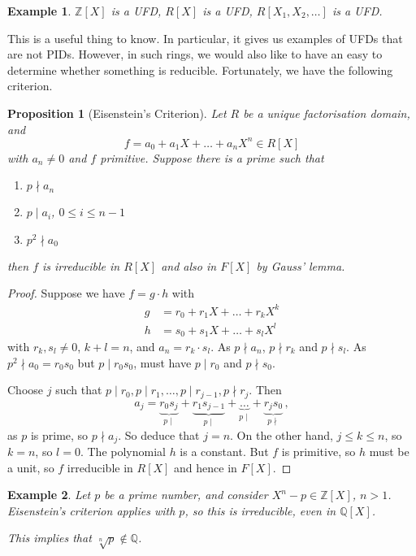 \documentclass{article}
\theoremstyle{plain}\theoremheaderfont{\normalfont\itshape}\theorembodyfont{\rmfamily}\theoremseparator{.}\newtheorem*{rem}{Remark}\newtheorem*{ex}{Example}\newtheorem*{proof}{Proof}\newtheorem*{altp}{Alternative proof}\newtheorem*{nonex}{Non-Example}
\theoremstyle{plain}\theoremheaderfont{\normalfont\bfseries}\theorembodyfont{\rmfamily}\theoremseparator{.}\newtheorem{thm}{Theorem}[section]\newtheorem{lem}[thm]{Lemma}\newtheorem{prop}[thm]{Proposition}\newtheorem*{cor}{Corollary}\newtheorem{defn}[thm]{Definition}\newtheorem{clm}[thm]{Claim}\newtheorem{clminproof}{Claim}\newtheorem*{notn}{Notation}\newtheorem*{exer}{Exercise}\newtheorem*{lemnn}{Lemma}
\theoremstyle{break}\theoremheaderfont{\normalfont\itshape}\theorembodyfont{\rmfamily}\theoremseparator{.\medskip}\newtheorem*{proofskip}{Proof}\newtheorem*{exs}{Examples}\newtheorem*{rems}{Remarks}\newtheorem*{obs}{Observations}
\theoremstyle{break}\theoremheaderfont{\normalfont\bfseries}\theorembodyfont{\rmfamily}\theoremseparator{.\medskip}\newtheorem{lemskip}[thm]{Lemma}\newtheorem{defnskip}[thm]{Definition}\newtheorem{propskip}[thm]{Proposition}\newtheorem{thmskip}[thm]{Theorem}
\numberwithin{equation}{section}
\newcommand{\ZZ}{\mathbb{Z}}
\newcommand{\QQ}{\mathbb{Q}}
\begin{document}
    \begin{ex}
        \(\ZZ[X]\) is a UFD, \(R[X]\) is a UFD, \(R[X_1,X_2,\dots]\) is a UFD.
    \end{ex}
    This is a useful thing to know. In particular, it gives us examples of UFDs that are not PIDs. However, in such rings, we would also like to have an easy to determine whether something is reducible. Fortunately, we have the following criterion.
    \begin{prop}[Eisenstein's Criterion]
        Let \(R\) be a unique factorisation domain, and
        \[f=a_0+a_1X+\dots+a_nX^n\in R[X]\]
        with \(a_n\ne 0\) and \(f\) primitive. Suppose there is a prime such that
        \begin{enumerate}[topsep=0pt,label=(\roman*)]
            \item \(p\nmid a_n\)
            \item \(p\mid a_i\), \(0\le i\le n-1\)
            \item \(p^2\nmid a_0\)
        \end{enumerate}
        then \(f\) is irreducible in \(R[X]\) and also in \(F[X]\) by Gauss' lemma.
    \end{prop}
    \begin{proof}
        Suppose we have \(f=g\cdot h\) with
        \begin{align*}
            g&=r_0+r_1X+\dots +r_kX^k\\
            h&=s_0+s_1X+\dots +s_lX^l
        \end{align*}
        with \(r_k,s_l\ne 0\), \(k+l=n\), and \(a_n=r_k\cdot s_l\). As \(p\nmid a_n\), \(p\nmid r_k\) and \(p\nmid s_l\). As \(p^2\nmid a_0=r_0s_0\) but \(p\mid r_0s_0\), must have \(p\mid r_0\) and \(p\nmid s_0\).

        Choose \(j\) such that \(p\mid r_0, p\mid r_1, \dots,p\mid r_{j-1},p\nmid r_j\). Then
        \[a_j=\underbrace{r_0s_j}_{p\mid}+\underbrace{r_1s_{j-1}}_{p\mid}+\underbrace{\dots}_{p\mid}+\underbrace{r_js_0}_{p\nmid}\,,\]
        as \(p\) is prime, so \(p\nmid a_j\). So deduce that \(j=n\). On the other hand, \(j\le k\le n\), so \(k=n\), so \(l=0\). The polynomial \(h\) is a constant. But \(f\) is primitive, so \(h\) must be a unit, so \(f\) irreducible in \(R[X]\) and hence in \(F[X]\).
    \end{proof}
    \begin{ex}
        Let \(p\) be a prime number, and consider \(X^n-p\in\ZZ[X]\), \(n>1\). Eisenstein's criterion applies with \(p\), so this is irreducible, even in \(\QQ[X]\).

        This implies that \(\sqrt[n]{p}\notin\QQ\).
    \end{ex}
\end{document}
